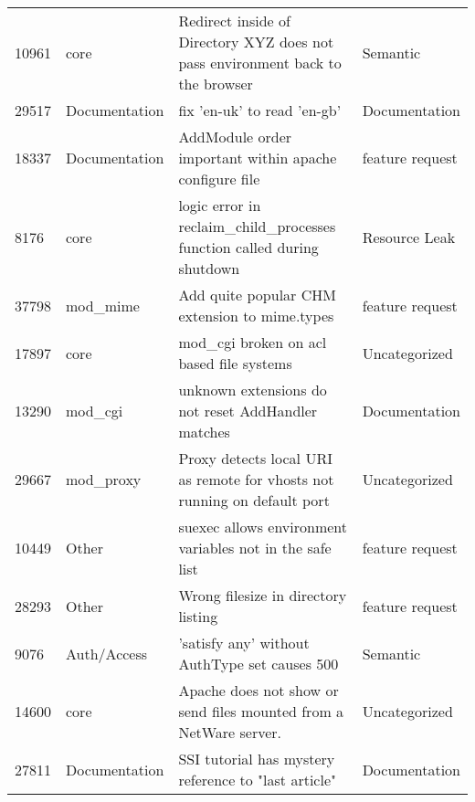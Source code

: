 \begin{longtable}[c]{llll}
10961  & core               & Redirect inside of Directory XYZ does not pass environment back to the browser            & Semantic          \\
29517  & Documentation      & fix 'en-uk' to read 'en-gb'                                                                                    & Documentation     \\
18337  & Documentation      & AddModule order important within apache configure file                                                         & feature request   \\
8176   & core               & logic error in reclaim\_child\_processes function called during shutdown                                       & Resource Leak     \\
37798  & mod\_mime          & Add quite popular CHM extension to mime.types                                                                  & feature request   \\
17897  & core               & mod\_cgi broken on acl based file systems                                                                      & Uncategorized     \\
13290  & mod\_cgi           & unknown extensions do not reset AddHandler matches                                                             & Documentation     \\
29667  & mod\_proxy         & Proxy detects local URI as remote for vhosts not running on default port                                       & Uncategorized     \\
10449  & Other              & suexec allows environment variables not in the safe list                                                       & feature request   \\
28293  & Other              & Wrong filesize in directory listing                                                                            & feature request   \\
9076   & Auth/Access        & 'satisfy any' without AuthType set causes 500                                                                  & Semantic          \\
14600  & core               & Apache does not show or send files mounted from a NetWare server.                                              & Uncategorized     \\
27811  & Documentation      & SSI tutorial has mystery reference to "last article"                                                           & Documentation     \\

\end{longtable}
